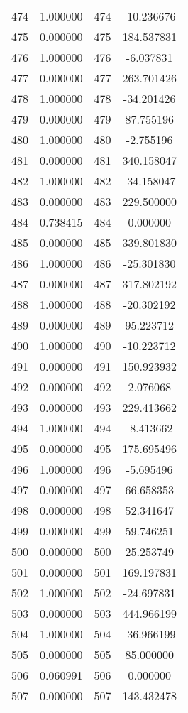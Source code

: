 \documentclass[12pt]{article}
\begin{document}
\begin{longtable}{@{}cccc@{}}
474 & 1.000000 & 474 & -10.236676 \\
475 & 0.000000 & 475 & 184.537831 \\
476 & 1.000000 & 476 & -6.037831 \\
477 & 0.000000 & 477 & 263.701426 \\
478 & 1.000000 & 478 & -34.201426 \\
479 & 0.000000 & 479 & 87.755196 \\
480 & 1.000000 & 480 & -2.755196 \\
481 & 0.000000 & 481 & 340.158047 \\
482 & 1.000000 & 482 & -34.158047 \\
483 & 0.000000 & 483 & 229.500000 \\
484 & 0.738415 & 484 & 0.000000 \\
485 & 0.000000 & 485 & 339.801830 \\
486 & 1.000000 & 486 & -25.301830 \\
487 & 0.000000 & 487 & 317.802192 \\
488 & 1.000000 & 488 & -20.302192 \\
489 & 0.000000 & 489 & 95.223712 \\
490 & 1.000000 & 490 & -10.223712 \\
491 & 0.000000 & 491 & 150.923932 \\
492 & 0.000000 & 492 & 2.076068 \\
493 & 0.000000 & 493 & 229.413662 \\
494 & 1.000000 & 494 & -8.413662 \\
495 & 0.000000 & 495 & 175.695496 \\
496 & 1.000000 & 496 & -5.695496 \\
497 & 0.000000 & 497 & 66.658353 \\
498 & 0.000000 & 498 & 52.341647 \\
499 & 0.000000 & 499 & 59.746251 \\
500 & 0.000000 & 500 & 25.253749 \\
501 & 0.000000 & 501 & 169.197831 \\
502 & 1.000000 & 502 & -24.697831 \\
503 & 0.000000 & 503 & 444.966199 \\
504 & 1.000000 & 504 & -36.966199 \\
505 & 0.000000 & 505 & 85.000000 \\
506 & 0.060991 & 506 & 0.000000 \\
507 & 0.000000 & 507 & 143.432478 \\

\end{longtable}
\end{document}
